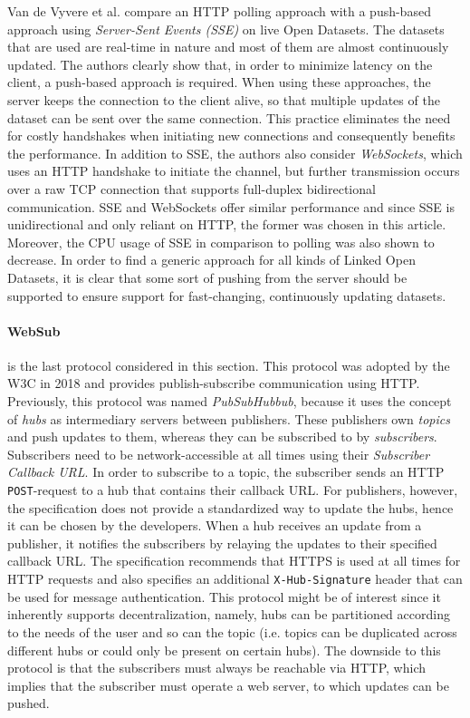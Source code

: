 \noindent Van de Vyvere et al. \cite{van2020comparing} compare an HTTP polling approach with a push-based approach using \emph{Server-Sent Events (SSE)} on live Open Datasets. The datasets that are used are real-time in nature and most of them are almost continuously updated. The authors clearly show that, in order to minimize latency on the client, a push-based approach is required. When using these approaches, the server keeps the connection to the client alive, so that multiple updates of the dataset can be sent over the same connection. This practice eliminates the need for costly handshakes when initiating new connections and consequently benefits the performance. In addition to SSE, the authors also consider \emph{WebSockets}, which uses an HTTP handshake to initiate the channel, but further transmission occurs over a raw TCP connection that supports full-duplex bidirectional communication. SSE and WebSockets offer similar performance and since SSE is unidirectional and only reliant on HTTP, the former was chosen in this article. Moreover, the CPU usage of SSE in comparison to polling was also shown to decrease. In order to find a generic approach for all kinds of Linked Open Datasets, it is clear that some sort of pushing from the server should be supported to ensure support for fast-changing, continuously updating datasets.

\paragraph{WebSub}\cite{WebSub} \label{par:delivery-websub} is the last protocol considered in this section. This protocol was adopted by the W3C in 2018 and provides publish-subscribe communication using HTTP. Previously, this protocol was named \emph{PubSubHubbub}, because it uses the concept of \emph{hubs} as intermediary servers between publishers. These publishers own \emph{topics} and push updates to them, whereas they can be subscribed to by \emph{subscribers}. Subscribers need to be network-accessible at all times using their \emph{Subscriber Callback URL}. In order to subscribe to a topic, the subscriber sends an HTTP \texttt{POST}-request to a hub that contains their callback URL. For publishers, however, the specification does not provide a standardized way to update the hubs, hence it can be chosen by the developers. When a hub receives an update from a publisher, it notifies the subscribers by relaying the updates to their specified callback URL. The specification recommends that HTTPS is used at all times for HTTP requests and also specifies an additional \texttt{X-Hub-Signature} header that can be used for message authentication. This protocol might be of interest since it inherently supports decentralization, namely, hubs can be partitioned according to the needs of the user and so can the topic (i.e. topics can be duplicated across different hubs or could only be present on certain hubs). The downside to this protocol is that the subscribers must always be reachable via HTTP, which implies that the subscriber must operate a web server, to which updates can be pushed.